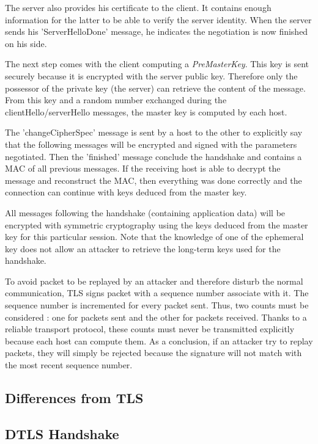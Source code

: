 The server also provides his certificate to the client. It contains enough information for the latter to be able to verify the server identity. When the server sends his 'ServerHelloDone' message, he indicates the negotiation is now finished on his side.

The next step comes with the client computing a \textit{PreMasterKey}. This key is sent securely because it is encrypted with the server public key. Therefore only the possessor of the private key (the server) can retrieve the content of the message. From this key and a random number exchanged during the clientHello/serverHello messages, the master key is computed by each host.

The 'changeCipherSpec' message is sent by a host to the other to explicitly say that the following messages will be encrypted and signed with the parameters negotiated. Then the 'finished' message conclude the handshake and contains a MAC of all previous messages. If the receiving host is able to decrypt the message and reconstruct the MAC, then everything was done correctly and the connection can continue with keys deduced from the master key.

All messages following the handshake (containing application data) will be encrypted with symmetric cryptography using the keys deduced from the master key for this particular session. Note that the knowledge of one of the ephemeral key does not allow an attacker to retrieve the long-term keys used for the handshake.

To avoid packet to be replayed by an attacker and therefore disturb the normal communication, TLS signs packet with a sequence number associate with it. The sequence number is incremented for every packet sent. Thus, two counts must be considered : one for packets sent and the other for packets received. Thanks to a reliable transport protocol, these counts must never be transmitted explicitly because each host can compute them. As a conclusion, if an attacker try to replay packets, they will simply be rejected because the signature will not match with the most recent sequence number.



\subsection{Differences from TLS}


\subsection{DTLS Handshake}

